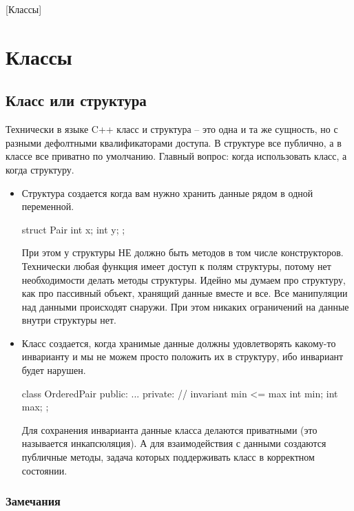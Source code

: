[Классы]


\section{Классы}

\subsection{Класс или структура}

Технически в языке C++ класс и структура -- это одна и та же сущность, но с разными дефолтными квалификаторами доступа.
В структуре все публично, а в классе все приватно по умолчанию.
Главный вопрос: когда использовать класс, а когда структуру.

\begin{itemize}
\item Структура создается когда вам нужно хранить данные рядом в одной переменной.
\begin{cppcode}
struct Pair {
  int x;
  int y;
};
\end{cppcode}
При этом у структуры НЕ должно быть методов в том числе конструкторов.
Технически любая функция имеет доступ к полям структуры, потому нет необходимости делать методы структуры.
Идейно мы думаем про структуру, как про пассивный объект, хранящий данные вместе и все.
Все манипуляции над данными происходят снаружи.
При этом никаких ограничений на данные внутри структуры нет.

\item Класс создается, когда хранимые данные должны удовлетворять какому-то инварианту и мы не можем просто положить их в структуру, ибо инвариант будет нарушен.
\begin{cppcode}
class OrderedPair {
public:
  ...
private:
  // invariant min <= max
  int min;
  int max;
};
\end{cppcode}
Для сохранения инварианта данные класса делаются приватными (это называется инкапсюляция).
А для взаимодействия с данными создаются публичные методы, задача которых поддерживать класс в корректном состоянии.
\end{itemize}

\subsubsection{Замечания}
\label{section::Class::RawData}

